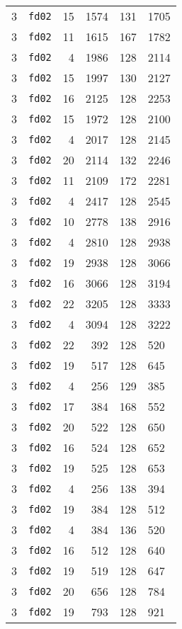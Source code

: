 \documentclass{article}
\begin{document}
\begin{table}[h!]
\begin{tabular}{llrrrl}
    3 & \texttt{fd02} & 15 & 1574 & 131 & 1705 \\
    3 & \texttt{fd02} & 11 & 1615 & 167 & 1782 \\
    3 & \texttt{fd02} & 4 & 1986 & 128 & 2114 \\
    3 & \texttt{fd02} & 15 & 1997 & 130 & 2127 \\
    3 & \texttt{fd02} & 16 & 2125 & 128 & 2253 \\
    3 & \texttt{fd02} & 15 & 1972 & 128 & 2100 \\
    3 & \texttt{fd02} & 4 & 2017 & 128 & 2145 \\
    3 & \texttt{fd02} & 20 & 2114 & 132 & 2246 \\
    3 & \texttt{fd02} & 11 & 2109 & 172 & 2281 \\
    3 & \texttt{fd02} & 4 & 2417 & 128 & 2545 \\
    3 & \texttt{fd02} & 10 & 2778 & 138 & 2916 \\
    3 & \texttt{fd02} & 4 & 2810 & 128 & 2938 \\
    3 & \texttt{fd02} & 19 & 2938 & 128 & 3066 \\
    3 & \texttt{fd02} & 16 & 3066 & 128 & 3194 \\
    3 & \texttt{fd02} & 22 & 3205 & 128 & 3333 \\
    3 & \texttt{fd02} & 4 & 3094 & 128 & 3222 \\
    3 & \texttt{fd02} & 22 & 392 & 128 & 520 \\
    3 & \texttt{fd02} & 19 & 517 & 128 & 645 \\
    3 & \texttt{fd02} & 4 & 256 & 129 & 385 \\
    3 & \texttt{fd02} & 17 & 384 & 168 & 552 \\
    3 & \texttt{fd02} & 20 & 522 & 128 & 650 \\
    3 & \texttt{fd02} & 16 & 524 & 128 & 652 \\
    3 & \texttt{fd02} & 19 & 525 & 128 & 653 \\
    3 & \texttt{fd02} & 4 & 256 & 138 & 394 \\
    3 & \texttt{fd02} & 19 & 384 & 128 & 512 \\
    3 & \texttt{fd02} & 4 & 384 & 136 & 520 \\
    3 & \texttt{fd02} & 16 & 512 & 128 & 640 \\
    3 & \texttt{fd02} & 19 & 519 & 128 & 647 \\
    3 & \texttt{fd02} & 20 & 656 & 128 & 784 \\
    3 & \texttt{fd02} & 19 & 793 & 128 & 921 \\

\end{tabular}
\end{table}
\end{document}
